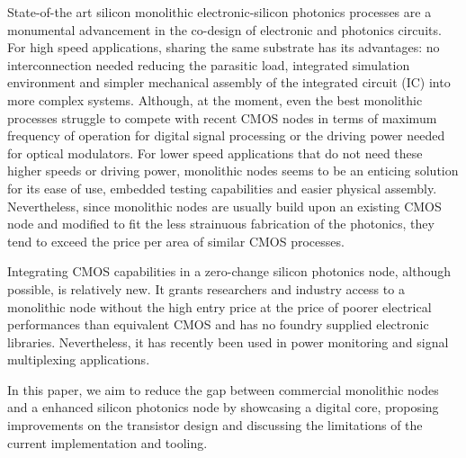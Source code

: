 State-of-the art silicon monolithic electronic-silicon photonics processes are a monumental advancement in the co-design of electronic and photonics circuits.
For high speed applications, sharing the same substrate has its advantages: no interconnection needed reducing the parasitic load, integrated simulation environment and simpler mechanical assembly of the integrated circuit (IC) into more complex systems.
Although, at the moment, even the best monolithic processes struggle to compete with recent CMOS nodes in terms of maximum frequency of operation for digital signal processing or the driving power needed for optical modulators. 
For lower speed applications that do not need these higher speeds or driving power, monolithic nodes seems to be an enticing solution for its ease of use, embedded testing capabilities and easier physical assembly.
Nevertheless, since monolithic nodes are usually build upon an existing CMOS node and modified to fit the less strainuous fabrication of the photonics, they tend to exceed the price per area of similar CMOS processes\cite{shekhar_roadmapping_2024}. 

Integrating CMOS capabilities in a zero-change silicon photonics node, although possible, is relatively new\cite{zanetto_unconventional_2023,shekhar_roadmapping_2024}. 
It grants researchers and industry access to a monolithic node without the high entry price at the price of poorer electrical performances than equivalent CMOS and has no foundry supplied electronic libraries.
Nevertheless, it has recently been used in power monitoring and signal multiplexing applications\cite{crico_monolithic_2024,zanetto_timemultiplexed_2023}.

In this paper, we aim to reduce the gap between commercial monolithic nodes and a enhanced silicon photonics node by showcasing a digital core, proposing improvements on the transistor design and discussing the limitations of the current implementation and tooling.





